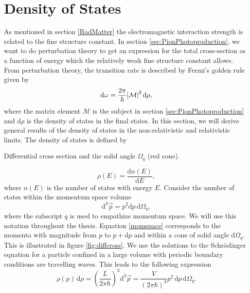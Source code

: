 \section{Density of States}\label{sec:densityofstates}
As mentioned in section \ref{RadMatter} the electromagnetic interaction strength is related to the fine structure constant. In section \ref{sec:PionPhotoproduction}, we want to do perturbation theory to get an expression for the total cross-section as a function of energy which the relatively weak fine structure constant allows. From perturbation theory, the transition rate is described by Fermi's golden rule given by
\begin{equation} \label{FermiGolden}
	\text{d}\omega = \frac{2\pi}{\hbar}\abs{\mathcal{M}}^2 \text{d}\rho,
\end{equation}
where the matrix element $\mathcal{M}$ is the subject in section \ref{sec:PionPhotoproduction} and $\text{d}\rho$ is the density of states in the final states. In this section, we will derive general results of the density of states in the non-relativistic and relativistic limits. The density of states is defined by
\begin{marginfigure}
	\centering
	
	\caption{Differential cross section and the solid angle $\Omega_q$ (red cone).}
	\label{fig:diffcross}
\end{marginfigure}
\begin{equation} \label{DensityOfStates}
	\rho(E) = \frac{\text{d}n(E)}{\text{d}E},
\end{equation}
where $n(E)$ is the number of states with energy $E$. Consider the number of states within the momentum space volume
\begin{equation} \label{momspace}
	\text{d}^3\vec{p} = p^2 \text{d}p \, \text{d}\Omega_q,
\end{equation}
where the subscript $q$ is used to empathize momentum space. We will use this notation throughout the thesis. Equation \eqref{momspace} corresponds to the momenta with magnitude from $p$ to $p+\text{d}p$ and within a cone of solid angle $\text{d}\Omega_q$. This is illustrated in figure \ref{fig:diffcross}. We use the solutions to the Schrödinger equation for a particle confined in a large volume with periodic boundary conditions are travelling waves. This leads to the following expression
\begin{equation} \label{densityrho}
	\rho(p) \, \text{d}\rho = \left( \frac{L}{2\pi\hbar}\right)^3 \text{d}^3 \vec{p} = \frac{V}{(2\pi\hbar)^3} p^2 \, \text{d}p \, \text{d}\Omega_q.
\end{equation}
